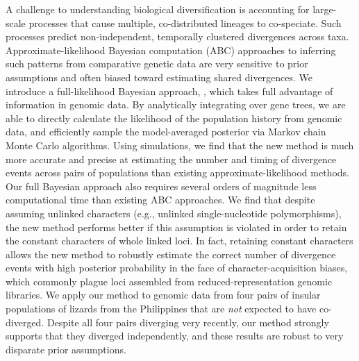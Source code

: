 A challenge to understanding biological diversification is accounting for
large-scale processes that cause multiple, co-distributed lineages to
co-speciate.
Such processes predict non-independent, temporally clustered divergences across
taxa.
Approximate-likelihood Bayesian computation (ABC) approaches to inferring such
patterns from comparative genetic data are very sensitive to prior assumptions
and often biased toward estimating shared divergences.
We introduce a full-likelihood Bayesian approach, \ecoevolity, which takes full
advantage of information in genomic data.
By analytically integrating over gene trees, we are able to directly calculate
the likelihood of the population history from genomic data, and efficiently
sample the model-averaged posterior via Markov chain Monte Carlo algorithms.
Using simulations, we find that the new method is much more accurate and
precise at estimating the number and timing of divergence events across pairs
of populations than existing approximate-likelihood methods.
Our full Bayesian approach also requires several orders of magnitude less
computational time than existing ABC approaches.
We find that despite assuming unlinked characters (e.g., unlinked
single-nucleotide polymorphisms), the new method performs better if this
assumption is violated in order to retain the constant characters of whole
linked loci.
In fact, retaining constant characters allows the new method to robustly
estimate the correct number of divergence events with high posterior
probability in the face of character-acquisition biases, which commonly
plague loci assembled from reduced-representation genomic libraries.
We apply our method to genomic data from four pairs of insular populations of
 lizards from the Philippines that are \emph{not} expected to have
co-diverged.
Despite all four pairs diverging very recently, our method strongly supports
that they diverged independently, and these results are robust to very
disparate prior assumptions.
